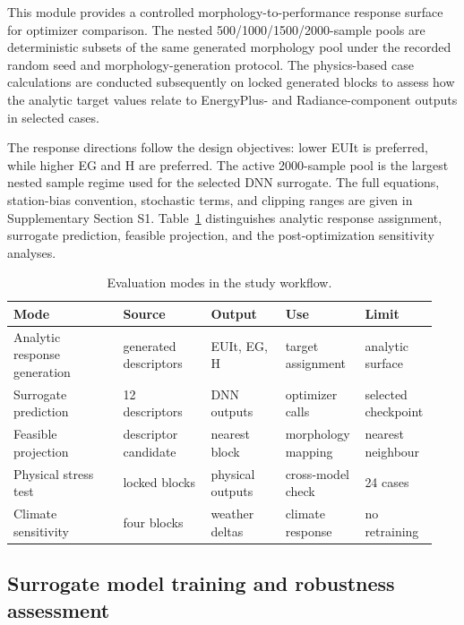 \documentclass[final,3p,times,numbers,sort&compress]{elsarticle}
\newcommand{\maintablesetup}{%
  \small
  \setlength{\tabcolsep}{4.5pt}%
  \renewcommand{\arraystretch}{1.08}%
}
\def\textcolor#1#2{#2}%
\def\rev#1{#1}%
\newif\ifshowrevision
\newcommand{\rev}[1]{%
  \ifshowrevision{\textcolor{revisionblue}{#1}}\else#1\fi%
}
\newenvironment{revblock}{%
  \ifshowrevision\color{revisionblue}\fi%
}{}
\begin{document}
\rev{This module provides a controlled morphology-to-performance response surface for optimizer comparison. The nested 500/1000/1500/2000-sample pools are deterministic subsets of the same generated morphology pool under the recorded random seed and morphology-generation protocol. The physics-based case calculations are conducted subsequently on locked generated blocks to assess how the analytic target values relate to EnergyPlus- and Radiance-component outputs in selected cases.}

\rev{The response directions follow the design objectives: lower EUIt is preferred, while higher EG and H are preferred. The active 2000-sample pool is the largest nested sample regime used for the selected DNN surrogate. The full equations, station-bias convention, stochastic terms, and clipping ranges are given in Supplementary Section S1. Table~\ref{tab:evaluation-modes} distinguishes analytic response assignment, surrogate prediction, feasible projection, and the post-optimization sensitivity analyses.}

\begin{table}[!htbp]
\centering
\caption{Evaluation modes in the study workflow.}
\label{tab:evaluation-modes}
\maintablesetup
\begin{threeparttable}
\begin{revblock}
\begin{tabularx}{\linewidth}{@{}p{0.25\linewidth}p{0.20\linewidth}p{0.17\linewidth}p{0.17\linewidth}p{0.15\linewidth}@{}}
\toprule
Mode & Source & Output & Use & Limit \\
\midrule
Analytic response generation & generated descriptors & EUIt, EG, H & target assignment & analytic surface \\
Surrogate prediction & 12 descriptors & DNN outputs & optimizer calls & selected checkpoint \\
Feasible projection & descriptor candidate & nearest block & morphology mapping & nearest neighbour \\
Physical stress test & locked blocks & physical outputs & cross-model check & 24 cases \\
Climate sensitivity & four blocks & weather deltas & climate response & no retraining \\
\bottomrule
\end{tabularx}
\end{revblock}
\end{threeparttable}
\end{table}

\subsection{Surrogate model training and robustness assessment}
\end{document}
